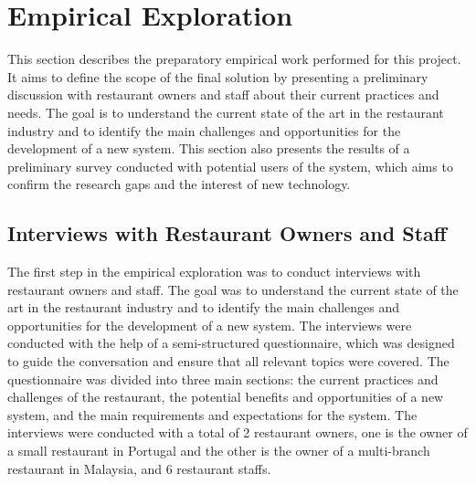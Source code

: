 \section{Empirical Exploration}
This section describes the preparatory empirical work performed for this project. It aims to define the scope of the final solution by presenting a preliminary discussion with restaurant owners and staff about their current practices and needs. The goal is to understand the current state of the art in the restaurant industry and to identify the main challenges and opportunities for the development of a new system. This section also presents the results of a preliminary survey conducted with potential users of the system, which aims to confirm the research gaps and the interest of new technology.

\subsection*{Interviews with Restaurant Owners and Staff}
The first step in the empirical exploration was to conduct interviews with restaurant owners and staff. The goal was to understand the current state of the art in the restaurant industry and to identify the main challenges and opportunities for the development of a new system. The interviews were conducted with the help of a semi-structured questionnaire, which was designed to guide the conversation and ensure that all relevant topics were covered. The questionnaire was divided into three main sections: the current practices and challenges of the restaurant, the potential benefits and opportunities of a new system, and the main requirements and expectations for the system. The interviews were conducted with a total of 2 restaurant owners, one is the owner of a small restaurant in Portugal and the other is the owner of a multi-branch restaurant in Malaysia, and 6 restaurant staffs.


